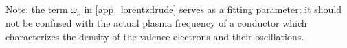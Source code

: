 Note: the term $\omega_p$ in \cref{app_lorentzdrude} serves as a fitting parameter; it should not be confused with the actual plasma frequency of a conductor which characterizes the density of the valence electrons and their oscillations.
%
%
%
%
%
%
